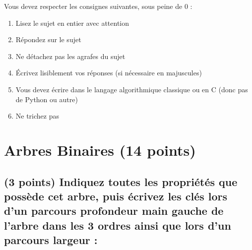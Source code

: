 \documentclass[11pt,a4paper]{article}
\begin{document}
\MakeExamTitle                   %


\bigskip

Vous devez respecter les consignes suivantes, sous peine de 0 :

\begin{enumerate}[label=\Roman*)]
\item Lisez le sujet en entier avec attention
\item Répondez sur le sujet
\item Ne détachez pas les agrafes du sujet
\item \'Ecrivez lisiblement vos réponses (si nécessaire en majuscules)
\item Vous devez écrire dans le langage algorithmique classique ou en C (donc pas de Python ou autre)
\item Ne trichez pas
\end{enumerate}


\vfillFirst

\section{Arbres Binaires (14 points)}

\subsection{(3 points) Indiquez toutes les propriétés que possède cet arbre, puis écrivez les clés lors d'un parcours profondeur main gauche de l'arbre dans les 3 ordres ainsi que lors d'un parcours largeur : }
\end{document}
